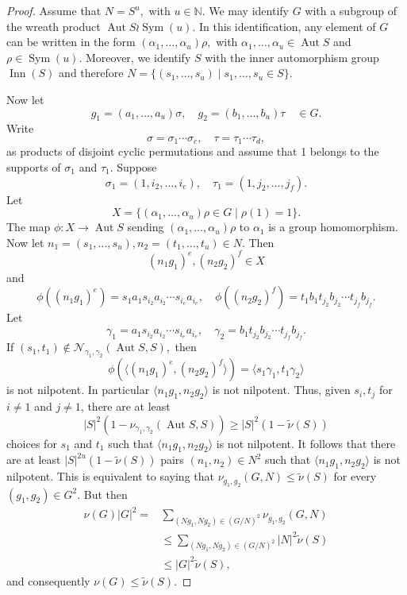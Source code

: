 \documentclass[10pt,a4paper]{amsart}
\DeclareMathOperator{\aut}{Aut}
\DeclareMathOperator{\inn}{Inn}
\DeclareMathOperator{\perm}{Sym}
\begin{document}
\begin{proof}
Assume that $N=S^u,$ with $u\in \mathbb N.$ 	We may identify $G$ with a subgroup of the wreath product $\aut S\wr \perm(u).$  In this identification, any element of $G$ can be written in the form $(\alpha_1,\dots,\alpha_u)\rho,$ with $\alpha_1,\dots,\alpha_u \in \aut S$ and $\rho \in \perm(u).$ 
Moreover, we identify $S$ with the inner automorphism group $\inn(S)$ and therefore
$N=\{(s_1,\dots,s_u)\mid s_1,\dots,s_u \in S\}.$

Now let $$g_1=(a_1,\dots,a_u)\sigma,\quad g_2=(b_1,\dots,b_u)\tau \quad \in G.$$
Write $$\sigma=\sigma_1\cdots \sigma_c, \quad  \tau=\tau_1\cdots \tau_d,$$ as products of disjoint cyclic permutations and assume that 1 belongs to the supports of $\sigma_1$ and $\tau_1.$ Suppose
$$\sigma_1=(1,i_2,\dots,i_e), \quad \tau_1=(1,j_2,\dots,j_f).$$
Let $$X=\{(\alpha_1,\dots,\alpha_u)\rho \in G \mid \rho(1)=1\}.$$ The map $\phi\colon X\to \aut S$ sending $(\alpha_1,\dots,\alpha_u)\rho$ to $\alpha_1$ is a group homomorphism. Now let $n_1=(s_1,\dots,s_u), n_2=(t_1,\dots,t_u) \in N$. Then
$$(n_1g_1)^e, (n_2g_2)^f \in X$$ and
$$\phi((n_1g_1)^e)=s_1a_1s_{i_2}a_{i_2}\cdots s_{i_e}a_{i_e},\quad
\phi((n_2g_2)^f)=t_1b_1t_{j_2}b_{j_2}\cdots t_{j_f}b_{j_f}.
$$
Let
$$\gamma_1=a_{1}s_{i_2}a_{i_2}\cdots s_{i_e}a_{i_e},\quad \gamma_2=b_{1}t_{j_2}b_{j_2}\cdots t_{j_f}b_{j_f}.$$
If $(s_1,t_1)\notin  \mathcal N_{\gamma_1,\gamma_2}(\aut S,S),$ then
	$$\phi(\langle (n_1g_1)^{e}, (n_2g_2)^f\rangle)=
	\langle s_1\gamma_1,t_1\gamma_2\rangle$$ is not nilpotent. In particular $\langle n_1g_1, n_2g_2\rangle$ is not nilpotent. Thus, given $s_i, t_j$ for $i\neq 1$ and $j\neq 1$, there are at least $$|S|^2(1-\nu_{\gamma_1,\gamma_2}(\aut S, S))\geq |S|^2(1-\tilde\nu(S))$$ choices for 
	$s_1$ and $t_1$ such that $\langle n_1g_1, n_2g_2\rangle$ is not nilpotent. It follows that there
	are at least $|S|^{2u}(1-\tilde \nu(S))$ pairs $(n_1,n_2)\in N^2$ such that $\langle n_1g_1,n_2g_2\rangle$ is not nilpotent. This is equivalent to saying that $\nu_{g_1,g_2}(G,N)\leq \tilde \nu(S)$ for every $(g_1,g_2) \in G^2.$ But then
	$$\begin{aligned}\nu(G)|G|^2=&\sum_{(Ng_1,Ng_2)\in  (G/N)^2}\nu_{g_1,g_2}(G,N)\\&\leq \sum_{(Ng_1,Ng_2)\in (G/N)^2}|N|^2\tilde\nu(S)\\&\leq |G|^2\tilde\nu(S),
	\end{aligned}$$
	and consequently $\nu(G)\leq \tilde \nu(S).$
\end{proof}
\end{document}
